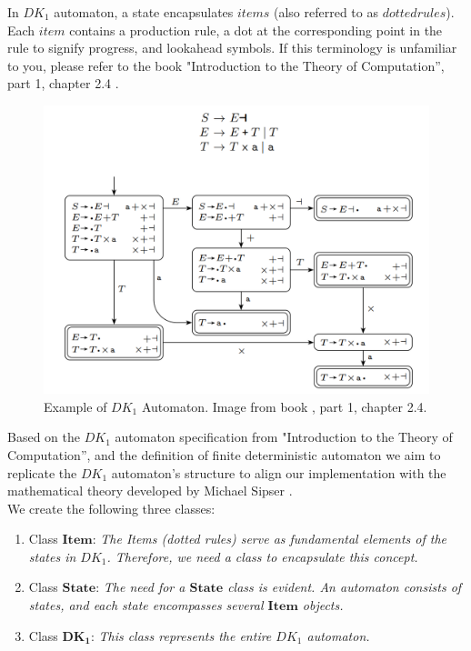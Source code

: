 In \( DK_{1} \) automaton, a state encapsulates \(items\) (also referred to as \(dotted rules\)). Each \(item\) contains a production rule, a dot at the corresponding point in the rule to signify progress, and lookahead symbols. If this terminology is unfamiliar to you, please refer to the book "Introduction to the Theory of Computation”, part 1, chapter 2.4 \cite{sipser}.\\

\begin{figure}[h!]
    \includegraphics[width=\linewidth]{DK1 example.png}
    \caption{Example of \(DK_{1}\) Automaton. Image from book \cite{sipser}, part 1, chapter 2.4.}
    \label{figure 3}
\end{figure}

Based on the \( DK_{1} \) automaton specification from "Introduction to the Theory of Computation”, and the definition of finite deterministic automaton we aim to replicate the \( DK_{1} \) automaton's structure to align our implementation with the mathematical theory developed by Michael Sipser \cite{sipser}.\\

We create the following three classes:
\begin{enumerate}
    \item Class \(\boldsymbol{Item}\): \textit{The Items (dotted rules) serve as fundamental elements of the states in \( DK_{1} \). Therefore, we need a class to encapsulate this concept.}
    \item Class \(\boldsymbol{State}\): \textit{The need for a \(\boldsymbol{State}\) class is evident. An automaton consists of states, and each state encompasses several \(\boldsymbol{Item}\) objects.}
    \item Class \(\boldsymbol{DK_{1}}\): \textit{This class represents the entire \( DK_{1} \) automaton.}
\end{enumerate}

